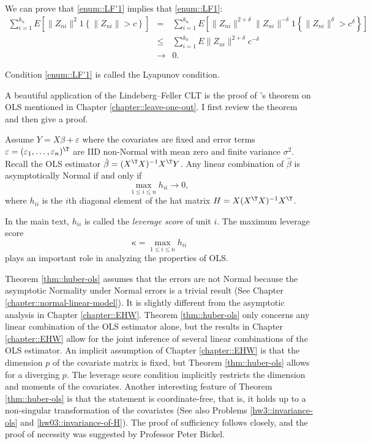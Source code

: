We can prove that \eqref{enum::LF'1} implies that \eqref{enum::LF1}:
\begin{eqnarray*}
\sum_{i=1}^{k_{n}}E\left[\|Z_{ni}\|^{2}1\left\{ \|Z_{ni}\|>c\right\} \right]
&=& \sum_{i=1}^{k_{n}}E\left[\|Z_{ni}\|^{2+\delta}  \|Z_{ni}\|^{-\delta} 1\left\{ \|Z_{ni}\|^{\delta}>c^{\delta} \right\} \right] \\
&\leq & \sum_{i=1}^{k_{n}}E \|Z_{ni}\|^{2+\delta} c^{- \delta} \\ &\rightarrow & 0.
\end{eqnarray*}

Condition \eqref{enum::LF'1} is called the Lyapunov condition.



A beautiful application of the Lindeberg--Feller CLT is the proof of \citet{huber1973robust}'s theorem on OLS mentioned in Chapter \ref{chapter::leave-one-out}. I first review the theorem and then give a proof. 


\begin{theorem}
\label{thm::huber-ols}
Assume $Y= X \beta + \varepsilon $ where the covariates are fixed and  error terms $\varepsilon = (\varepsilon_1, \ldots, \varepsilon_n)^{\T}$ are IID non-Normal with mean zero and finite variance $\sigma^2$. Recall the OLS estimator $\hat{\beta} = (X^{\T} X)^{-1} X^{\T} Y$. Any linear combination of $\hat{\beta}$ is asymptotically Normal  if and only if
$$
\max_{1\leq i \leq n} h_{ii} \rightarrow 0 ,
$$
where $h_{ii}$ is the $i$th diagonal element of the hat matrix $H  =  X (X^{\T} X)^{-1} X^{\T}$. 
\end{theorem}


In the main text, $h_{ii}$ is called the {\it leverage score} of unit $i$. The maximum leverage score 
$$
\kappa = \max_{1\leq i \leq n} h_{ii}
$$ 
plays an important role in analyzing the properties of OLS.


Theorem \ref{thm::huber-ols} assumes that the errors are not Normal because the asymptotic Normality under Normal errors is a trivial result (See Chapter \ref{chapter::normal-linear-model}). 
It is slightly different from the asymptotic analysis in Chapter \ref{chapter::EHW}. Theorem \ref{thm::huber-ols} only concerns any linear combination of the OLS estimator alone, but the results in  Chapter \ref{chapter::EHW} allow for the joint inference of several linear combinations of the OLS estimator. An implicit assumption of  Chapter \ref{chapter::EHW} is that the dimension $p$ of the covariate matrix is fixed, but Theorem \ref{thm::huber-ols} allows for a diverging $p$. The leverage score condition implicitly restricts the dimension and moments of the covariates. Another interesting feature of Theorem \ref{thm::huber-ols} is that the statement is coordinate-free, that is, it holds up to a non-singular transformation of the covariates (See also Problems \ref{hw3::invariance-ols} and \ref{hw03::invariance-of-H}). The proof of sufficiency follows \citet{huber1973robust} closely, and the proof of necessity was suggested by Professor Peter Bickel. 


